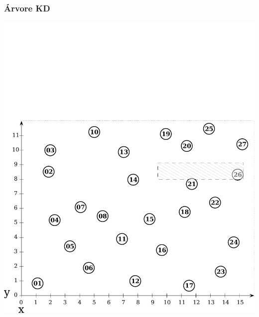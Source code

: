 \documentclass[10pt,xcolor=table,fleqn]{beamer}
\begin{document}
\begin{frame}
  \frametitle{Árvore KD}
  \begin{center}
    \includegraphics[scale=0.3]{../img/points-query/kdt/points}
  \end{center}
\end{frame}
\end{document}
